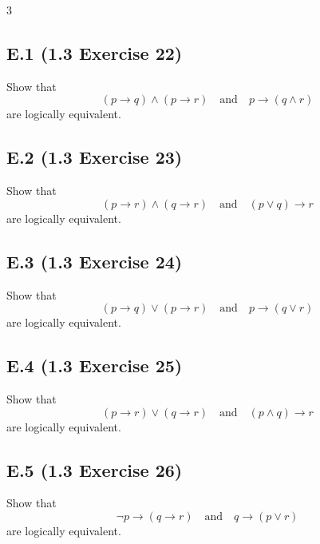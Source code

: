 \documentclass{article}
\newcommand{\problem}[2]{%
  \par
  \subsection*{#1 {\normalfont\footnotesize (#2)}}%
}
\begin{document}
\begin{multicols}{3}
\problem{E.1}{1.3 Exercise 22}
Show that
\[
  (p\to q)\land(p\to r)
  \quad\text{and}\quad
  p\to(q\land r)
\]
are logically equivalent.

\problem{E.2}{1.3 Exercise 23}
Show that
\[
  (p\to r)\land(q\to r)
  \quad\text{and}\quad
  (p\lor q)\to r
\]
are logically equivalent.

\problem{E.3}{1.3 Exercise 24}
Show that
\[
  (p\to q)\lor(p\to r)
  \quad\text{and}\quad
  p\to(q\lor r)
\]
are logically equivalent.

\problem{E.4}{1.3 Exercise 25}
Show that
\[
  (p\to r)\lor(q\to r)
  \quad\text{and}\quad
  (p\land q)\to r
\]
are logically equivalent.

\problem{E.5}{1.3 Exercise 26}
Show that
\[
  \neg p\to(q\to r)
  \quad\text{and}\quad
  q\to(p\lor r)
\]
are logically equivalent.
\end{multicols}
\end{document}
